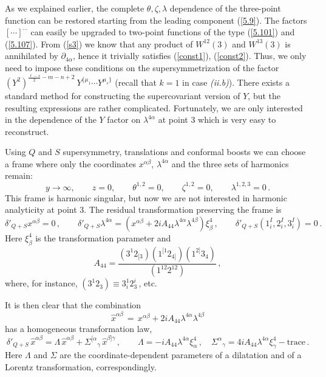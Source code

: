 \documentclass[a4paper,11pt]{article}
\begin{document}
As we explained earlier, the complete $\theta,\zeta,\lambda$ dependence of the
three-point function can be restored starting from the leading component
(\ref{5.9}). The factors $[\cdots]^{\cdots}$ can easily be upgraded to
two-point functions of the type (\ref{5.101}) and (\ref{5.107}). From
(\ref{s3}) we know that any product of $W^{12}(3)$ and $W^{13}(3)$ is
annihilated by $\partial_{4 \alpha}$, hence it trivially satisfies
(\ref{const1}), (\ref{const2}). Thus, we only need to impose these conditions
on the supersymmetrization of the factor $(Y^2)^{\frac{\ell-s}{2}-m-n+2}\
Y^{\{\mu_1}\cdots Y^{\mu_s\}}$ (recall that $k=1$ in case  {\it (ii.b)}). There
exists a standard method \cite{ParkOsb,P6} for constructing the supercovariant
version of $Y$, but the resulting expressions are rather complicated.
Fortunately, we are only interested in the dependence of the $Y$ factor on
$\lambda^{4\alpha}$ at point 3 which is very easy to reconstruct.

Using $Q$ and $S$ supersymmetry, translations and conformal boosts we can
choose a frame where only the coordinates $x^{\alpha\beta}$,
$\lambda^{4\alpha}$ and the three sets of harmonics remain:
\begin{equation} \label{frame}
y \rightarrow \infty,\qquad z = 0, \qquad \theta^{1,2} = 0, \qquad \zeta^{1,2}
= 0, \qquad \lambda^{1,2,3} = 0\,.
\end{equation}
This frame is harmonic singular, but now we are not interested in
harmonic analyticity at point 3. The residual transformation
preserving the frame is
\begin{equation}
{\delta'}_{Q+S} x^{\alpha \beta} = 0\,, \qquad {\delta'}_{Q+S} \lambda^{4
\alpha} = (x^{\alpha \beta} + 2i A_{44} \lambda^{4 \alpha} \lambda^{4 \beta})
\xi^4_\beta  \,, \qquad {\delta'}_{Q+S} (1^I_i,2^I_i,3^I_i) =0 \, .
\end{equation}
Here $\xi^4_\beta$ is the transformation parameter and
\begin{equation}
A_{44} = \frac{(3^1 2_{[3})(1^{[1} 2_{4]})(1^{2]}
3_4)}{(1^{12}2^{12})} \, ,
\end{equation}
where, for instance, $(3^1 2_{3})\equiv 3^1_i 2^i_3\,$, etc.

It is then clear that the combination
\begin{equation} \label{QShat}
\hat x^{\alpha \beta} \, = \, x^{\alpha \beta} + 2i A_{44}
\lambda^{4 \alpha} \lambda^{4 \beta}
\end{equation}
has a homogeneous transformation law,
\begin{equation}\label{trs}
{\delta'}_{Q+S} \, \hat x^{\alpha \beta} =  \Lambda\, \hat x^{\alpha \beta} +
\Sigma^{[\alpha}{}_\gamma \, \hat x ^{\beta] \gamma}\,, \qquad \Lambda = -i
A_{44} \lambda^{4 \alpha} \xi^4_\alpha\,, \quad \Sigma^{\alpha}{}_\gamma = 4i
A_{44} \lambda^{4 \alpha} \xi^4_\gamma - \mbox{trace}\,.
\end{equation}
Here $\Lambda$ and $\Sigma$ are the coordinate-dependent parameters of a
dilatation and of a Lorentz transformation, correspondingly.
\end{document}
